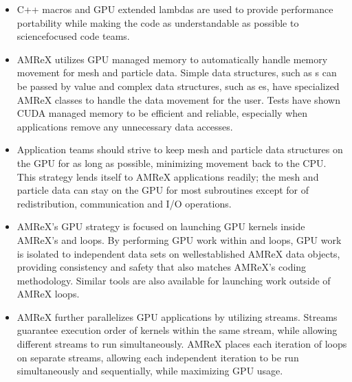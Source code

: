\documentclass[letterpaper,10pt,english]{sphinxmanual}
\begin{document}
\begin{itemize}
\item {} 
\sphinxAtStartPar
C++ macros and GPU extended lambdas are used to provide performance
portability while making the code as understandable as possible to
science\sphinxhyphen{}focused code teams.

\item {} 
\sphinxAtStartPar
AMReX utilizes GPU managed memory to automatically handle memory
movement for mesh and particle data.  Simple data structures, such
as s can be passed by value and complex data structures, such as
es, have specialized AMReX classes to handle the
data movement for the user.  Tests have shown CUDA managed memory
to be efficient and reliable, especially when applications remove
any unnecessary data accesses.

\item {} 
\sphinxAtStartPar
Application teams should strive to keep mesh and particle data structures
on the GPU for as long as possible, minimizing movement back to the CPU.
This strategy lends itself to AMReX applications readily; the mesh and
particle data can stay on the GPU for most subroutines except for
of redistribution, communication and I/O operations.

\item {} 
\sphinxAtStartPar
AMReX’s GPU strategy is focused on launching GPU kernels inside AMReX’s
 and  loops.  By performing GPU work within
 and  loops, GPU work is isolated to independent
data sets on well\sphinxhyphen{}established AMReX data objects, providing consistency and safety
that also matches AMReX’s coding methodology.  Similar tools are also available for
launching work outside of AMReX loops.

\item {} 
\sphinxAtStartPar
AMReX further parallelizes GPU applications by utilizing streams.
Streams guarantee execution order of kernels within the same stream, while
allowing different streams to run simultaneously. AMReX places each iteration
of  loops on separate streams, allowing each independent
iteration to be run simultaneously and sequentially, while maximizing GPU usage.


\end{itemize}
\end{document}
